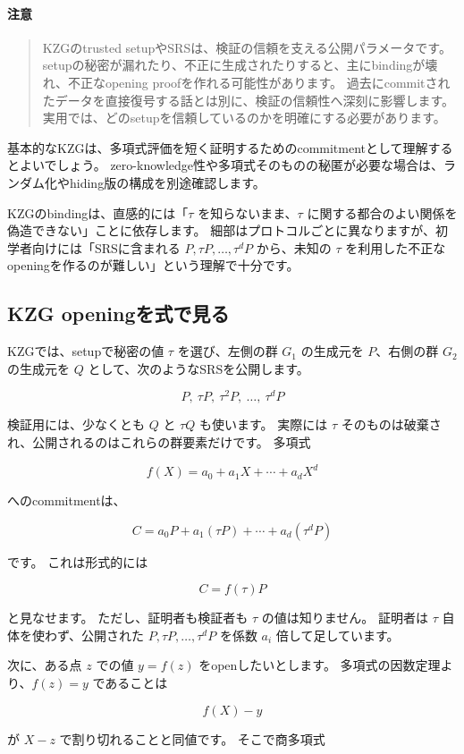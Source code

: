 \documentclass[a4paper,11pt]{ltjsarticle}
\newenvironment{warnbox}{%
  \paragraph*{注意}\begin{quote}
}{%
  \end{quote}
}
\begin{document}
\begin{warnbox}
KZGのtrusted setupやSRSは、検証の信頼を支える公開パラメータです。
setupの秘密が漏れたり、不正に生成されたりすると、主にbindingが壊れ、不正なopening proofを作れる可能性があります。
過去にcommitされたデータを直接復号する話とは別に、検証の信頼性へ深刻に影響します。
実用では、どのsetupを信頼しているのかを明確にする必要があります。
\end{warnbox}

基本的なKZGは、多項式評価を短く証明するためのcommitmentとして理解するとよいでしょう。
zero-knowledge性や多項式そのものの秘匿が必要な場合は、ランダム化やhiding版の構成を別途確認します。

KZGのbindingは、直感的には「\(\tau\) を知らないまま、\(\tau\) に関する都合のよい関係を偽造できない」ことに依存します。
細部はプロトコルごとに異なりますが、初学者向けには「SRSに含まれる \(P,\tau P,\ldots,\tau^dP\) から、未知の \(\tau\) を利用した不正なopeningを作るのが難しい」という理解で十分です。

\subsection{KZG openingを式で見る}

KZGでは、setupで秘密の値 \(\tau\) を選び、左側の群 \(G_1\) の生成元を \(P\)、右側の群 \(G_2\) の生成元を \(Q\) として、次のようなSRSを公開します。

\[
  P,\ \tau P,\ \tau^2P,\ \ldots,\ \tau^dP
\]

検証用には、少なくとも \(Q\) と \(\tau Q\) も使います。
実際には \(\tau\) そのものは破棄され、公開されるのはこれらの群要素だけです。
多項式

\[
  f(X)=a_0+a_1X+\cdots+a_dX^d
\]

へのcommitmentは、

\[
  C=a_0P+a_1(\tau P)+\cdots+a_d(\tau^dP)
\]

です。
これは形式的には

\[
  C=f(\tau)P
\]

と見なせます。
ただし、証明者も検証者も \(\tau\) の値は知りません。
証明者は \(\tau\) 自体を使わず、公開された \(P,\tau P,\ldots,\tau^dP\) を係数 \(a_i\) 倍して足しています。

次に、ある点 \(z\) での値 \(y=f(z)\) をopenしたいとします。
多項式の因数定理より、\(f(z)=y\) であることは

\[
  f(X)-y
\]

が \(X-z\) で割り切れることと同値です。
そこで商多項式
\end{document}
